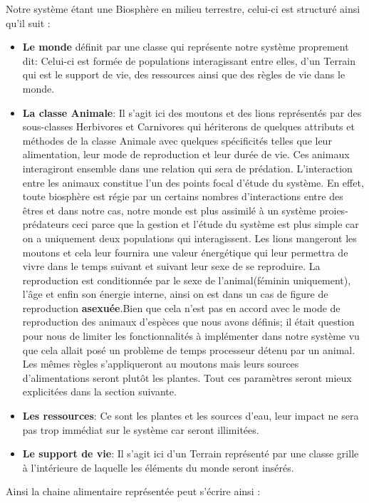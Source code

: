 \documentclass[a4paper,12pt]{article} %
\begin{document}
Notre système étant une Biosphère en milieu terrestre, celui-ci est structuré ainsi qu'il suit :
\begin{itemize}
    \item \textbf{Le monde} définit par une classe qui représente notre système proprement dit: 
    Celui-ci est formée de populations interagissant entre elles, d'un Terrain qui est le support de vie, des ressources ainsi que des règles de vie dans le monde.
    \item \textbf{La classe Animale}: Il s'agit ici des moutons et des lions représentés par des sous-classes Herbivores et Carnivores qui hériterons de quelques attributs et méthodes de la classe Animale avec quelques spécificités telles que leur alimentation, leur mode de reproduction et leur durée de vie. Ces animaux interagiront ensemble dans une relation qui sera de prédation. L'interaction entre les animaux constitue l'un des points focal d'étude du système. En effet, toute biosphère est régie par un certains nombres d'interactions entre des êtres et dans notre cas, notre monde est plus assimilé à un système proies-prédateurs ceci parce que la gestion et l'étude du système est plus simple car on a uniquement deux populations qui interagissent.
    Les lions mangeront les moutons et cela leur fournira une valeur énergétique qui leur permettra de vivre dans le temps suivant et suivant leur sexe de se reproduire. La reproduction est conditionnée par le sexe de l'animal(féminin uniquement), l'âge et enfin son énergie interne, ainsi on est dans un cas de figure de reproduction \textbf{asexuée}.Bien que cela n'est pas en accord avec le mode de reproduction des animaux d'espèces que nous avons définis; il était question pour nous de limiter les fonctionnalités à implémenter dans notre système vu que cela allait posé un problème de temps processeur détenu par un animal. Les mêmes règles s'appliqueront au moutons mais leurs sources d'alimentations seront plutôt les plantes. Tout ces paramètres seront mieux explicitées dans la section suivante.
    \item \textbf{Les ressources}: Ce sont les plantes et les sources d'eau, leur impact ne sera pas trop immédiat sur le système car seront illimitées.
    \item \textbf{Le support de vie}: Il s'agit ici d'un Terrain représenté par une classe grille à l'intérieure de laquelle les éléments du monde seront insérés.
\end{itemize}

Ainsi la chaine alimentaire représentée peut s'écrire ainsi :
\end{document}
